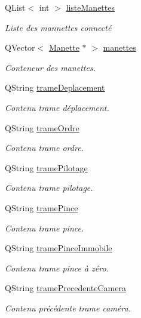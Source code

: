\begin{DoxyCompactItemize}
Q\+List$<$ int $>$ \hyperlink{class_rov_ac3bf6c7552073bd2d780e005205919a9}{liste\+Manettes}
\begin{DoxyCompactList}\small\item\em Liste des mannettes connecté \end{DoxyCompactList}\item 
Q\+Vector$<$ \hyperlink{class_manette}{Manette} $\ast$ $>$ \hyperlink{class_rov_a58ea20dc3615a732b87ac381bf1c0a83}{manettes}
\begin{DoxyCompactList}\small\item\em Conteneur des manettes. \end{DoxyCompactList}\item 
Q\+String \hyperlink{class_rov_ad30a06154c31cdb02eb28a0c7197731f}{trame\+Deplacement}
\begin{DoxyCompactList}\small\item\em Contenu trame déplacement. \end{DoxyCompactList}\item 
Q\+String \hyperlink{class_rov_aa813010d76738e268a4bbe3773663a38}{trame\+Ordre}
\begin{DoxyCompactList}\small\item\em Contenu trame ordre. \end{DoxyCompactList}\item 
Q\+String \hyperlink{class_rov_a379b288ce69a0bb9eaac8f673db8ae07}{trame\+Pilotage}
\begin{DoxyCompactList}\small\item\em Contenu trame pilotage. \end{DoxyCompactList}\item 
Q\+String \hyperlink{class_rov_a2c24d7c884d8fae07e452105037f8e2c}{trame\+Pince}
\begin{DoxyCompactList}\small\item\em Contenu trame pince. \end{DoxyCompactList}\item 
Q\+String \hyperlink{class_rov_a30595a8bd60324832b6a6eb5b542d211}{trame\+Pince\+Immobile}
\begin{DoxyCompactList}\small\item\em Contenu trame pince à zéro. \end{DoxyCompactList}\item 
Q\+String \hyperlink{class_rov_a66e64595d9bb97dfbfa6f2ed9548b216}{trame\+Precedente\+Camera}
\begin{DoxyCompactList}\small\item\em Contenu précédente trame caméra. \end{DoxyCompactList}\item 

\end{DoxyCompactItemize}
